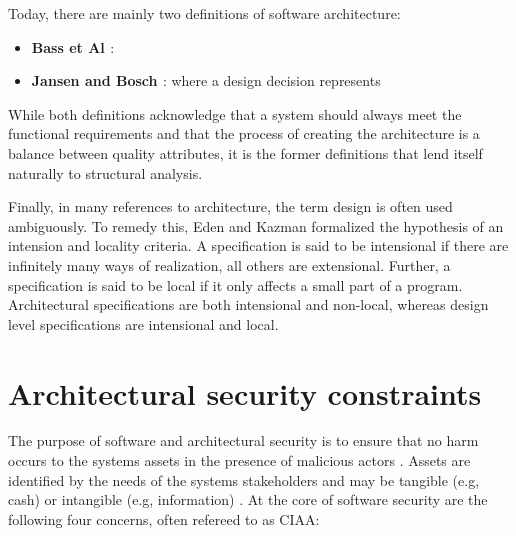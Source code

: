 Today, there are mainly two definitions of software architecture:

\begin{itemize}
    \item \textbf{Bass et Al \cite{bass_software_2013}}: 
    \item \textbf{Jansen and Bosch \cite{jansen_software_2005}}:  where a design decision represents 
\end{itemize}

While both definitions acknowledge that a system should always meet the functional requirements and that the process of creating the architecture is a balance between quality attributes, it is the former definitions that lend itself naturally to structural analysis.

Finally, in many references to architecture, the term design is often used ambiguously. To remedy this, Eden and Kazman \cite{eden_architecture_2003} formalized the hypothesis of an intension and locality criteria. A specification is said to be intensional if there are infinitely many ways of realization, all others are extensional. Further, a specification is said to be local if it only affects a small part of a program. Architectural specifications are both intensional and non-local, whereas design level specifications are intensional and local.

\section{Architectural security constraints}

The purpose of software and architectural security is to ensure that no harm occurs to the systems assets in the presence of malicious actors \cite{mcgraw_software_2004}. Assets are identified by the needs of the systems stakeholders and may be tangible (e.g, cash) or intangible (e.g, information) \cite{haley_security_2008}. At the core of software security are the following four concerns, often refereed to as CIAA:

